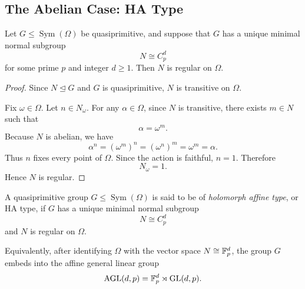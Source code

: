 \subsection{The Abelian Case: HA Type}

\begin{proposition}
Let \(G\leq \operatorname{Sym}(\Omega)\) be quasiprimitive, and suppose that \(G\) has a
unique minimal normal subgroup
\[
    N\cong C_p^d
\]
for some prime \(p\) and integer \(d\geq 1\). Then \(N\) is regular on \(\Omega\).
\end{proposition}

\begin{proof}
Since \(N\unlhd G\) and \(G\) is quasiprimitive, \(N\) is transitive on \(\Omega\).

Fix \(\omega\in\Omega\). Let \(n\in N_\omega\). For any \(\alpha\in\Omega\), since \(N\)
is transitive, there exists \(m\in N\) such that
\[
    \alpha=\omega^m.
\]
Because \(N\) is abelian, we have
\[
    \alpha^n
    =
    (\omega^m)^n
    =
    (\omega^n)^m
    =
    \omega^m
    =
    \alpha.
\]
Thus \(n\) fixes every point of \(\Omega\). Since the action is faithful, \(n=1\). Therefore
\[
    N_\omega=1.
\]
Hence \(N\) is regular.
\end{proof}

\begin{definition}[HA type]
A quasiprimitive group \(G\leq \operatorname{Sym}(\Omega)\) is said to be of
\emph{holomorph affine type}, or \(\mathrm{HA}\) type, if \(G\) has a unique minimal
normal subgroup
\[
    N\cong C_p^d
\]
and \(N\) is regular on \(\Omega\).

Equivalently, after identifying \(\Omega\) with the vector space \(N\cong \mathbb{F}_p^d\), the group
\(G\) embeds into the affine general linear group
\[
    \operatorname{AGL}(d,p)=\mathbb{F}_p^d\rtimes \operatorname{GL}(d,p).
\]
\end{definition}

